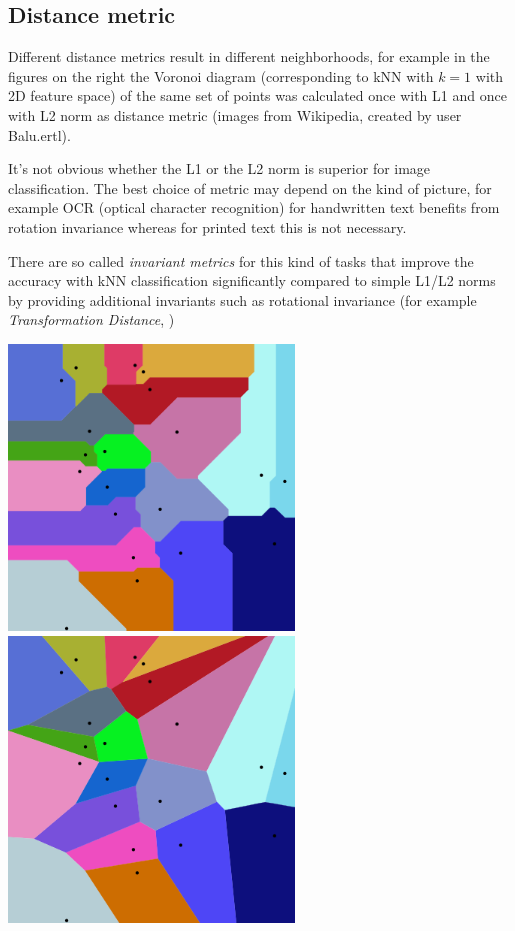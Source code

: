 \subsection{Distance metric}
%
\begin{minipage}{0.8\textwidth}
Different distance metrics result in different neighborhoods, for example in the figures on the right the Voronoi diagram (corresponding to kNN with $k=1$ with 2D feature space) of the same set of points was calculated once with L1 and once with L2 norm as distance metric (images from Wikipedia, created by user Balu.ertl).

It's not obvious whether the L1 or the L2 norm is superior for image classification. The best choice of metric may depend on the kind of picture, for example OCR (optical character recognition) for handwritten text benefits from rotation invariance whereas for printed text this is not necessary.

There are so called \textit{invariant metrics} for this kind of tasks that improve the accuracy with kNN classification significantly compared to simple L1/L2 norms by providing additional invariants such as rotational invariance (for example \textit{Transformation Distance}, \cite{simard})
\end{minipage}
%
\begin{minipage}{0.3\textwidth}
\centering

\includegraphics[width=0.57\textwidth]{./img/voroL1.png}
\includegraphics[width=0.57\textwidth]{./img/voroL2.png}
\end{minipage}

